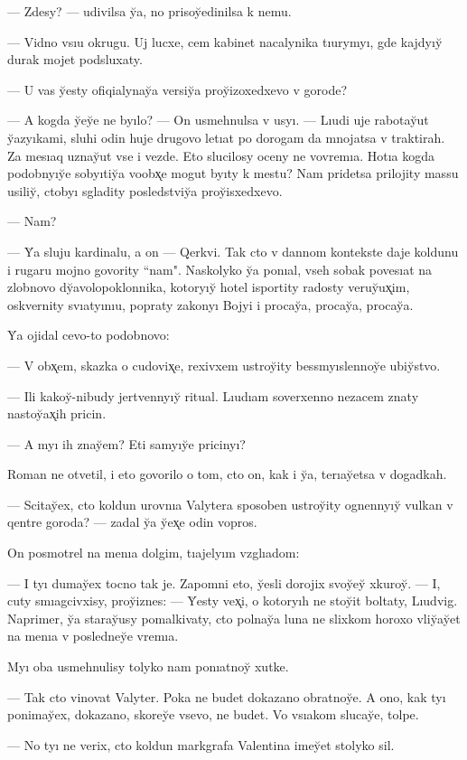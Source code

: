 \documentclass[10pt]{book}
\begin{document}
— Zdesy? — udivilsa y̆a, no prisoy̆edinilsa k nemu.

— Vidno vsıu okrugu. Uj lucxe, cem kabinet nacalynika tıurymyı, gde kajdyıy̆ durak mojet podsluxaty.

— U vas y̆esty ofiqialynay̆a versiy̆a proy̆izoxedxevo v gorode?

— A kogda y̆ey̆e ne byılo? — On usmehnulsa v usyı. — Lıudi uje rabotay̆ut y̆azyıkami, sluhi odin huje drugovo letıat po dorogam da mnojatsa v traktirah. Za mesıaq uznay̆ut vse i vezde. Eto slucilosy oceny ne vovremıa. Hotıa kogda podobnyıy̆e sobyıtiy̆a voobx̨e mogut byıty k mestu? Nam pridetsa prilojity massu usiliy̆, ctobyı sgladity posledstviy̆a proy̆isxedxevo.

— Nam?

— Y̆a sluju kardinalu, a on — Qerkvi. Tak cto v dannom kontekste daje koldunu i rugaru mojno govority ``nam". Naskolyko y̆a ponıal, vseh sobak povesıat na zlobnovo dy̆avolopoklonnika, kotoryıy̆ hotel isportity radosty veruy̆ux̨im, oskvernity svıatyınıu, popraty zakonyı Bojyi i procay̆a, procay̆a, procay̆a.

Y̆a ojidal cevo-to podobnovo:

— V obx̨em, skazka o cudovix̨e, rexivxem ustroy̆ity bessmyıslennoy̆e ubiy̆stvo.

— Ili kakoy̆-nibudy jertvennyıy̆ ritual. Lıudıam soverxenno nezacem znaty nastoy̆ax̨ih pricin.

— A myı ih znay̆em? Eti samyıy̆e pricinyı?

Roman ne otvetil, i eto govorilo o tom, cto on, kak i y̆a, terıay̆etsa v dogadkah.

— Scitay̆ex, cto koldun urovnıa Valytera sposoben ustroy̆ity ognennyıy̆ vulkan v qentre goroda? — zadal y̆a y̆ex̨e odin vopros.

On posmotrel na menıa dolgim, tıajelyım vzglıadom:

— I tyı dumay̆ex tocno tak je. Zapomni eto, y̆esli dorojix svoy̆ey̆ xkuroy̆. — I, cuty smıagcivxisy, proy̆iznes: — Y̆esty vex̨i, o kotoryıh ne stoy̆it boltaty, Lıudvig. Naprimer, y̆a staray̆usy pomalkivaty, cto polnay̆a luna ne slixkom horoxo vliy̆ay̆et na menıa v posledney̆e vremıa.

Myı oba usmehnulisy tolyko nam ponıatnoy̆ xutke.

— Tak cto vinovat Valyter. Poka ne budet dokazano obratnoy̆e. A ono, kak tyı ponimay̆ex, dokazano, skorey̆e vsevo, ne budet. Vo vsıakom slucay̆e, tolpe.

— No tyı ne verix, cto koldun markgrafa Valentina imey̆et stolyko sil.
\end{document}
